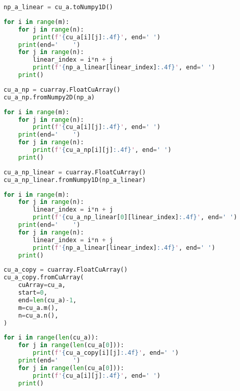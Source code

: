 \documentclass{article}
\begin{document}
    \begin{lstlisting}[language=Python]
np_a_linear = cu_a.toNumpy1D()
    \end{lstlisting}

    \begin{lstlisting}[language=Python]
for i in range(m):
    for j in range(n):
        print(f'{cu_a[i][j]:.4f}', end=' ')
    print(end='    ')
    for j in range(n):
        linear_index = i*n + j
        print(f'{np_a_linear[linear_index]:.4f}', end=' ')
    print()
    \end{lstlisting}

    \begin{lstlisting}[language=Python]
cu_a_np = cuarray.FloatCuArray()
cu_a_np.fromNumpy2D(np_a)
    \end{lstlisting}

    \begin{lstlisting}[language=Python]
for i in range(m):
    for j in range(n):
        print(f'{cu_a[i][j]:.4f}', end=' ')
    print(end='    ')
    for j in range(n):
        print(f'{cu_a_np[i][j]:.4f}', end=' ')
    print()
    \end{lstlisting}

    \begin{lstlisting}[language=Python]
cu_a_np_linear = cuarray.FloatCuArray()
cu_a_np_linear.fromNumpy1D(np_a_linear)
    \end{lstlisting}

    \begin{lstlisting}[language=Python]
for i in range(m):
    for j in range(n):
        linear_index = i*n + j
        print(f'{cu_a_np_linear[0][linear_index]:.4f}', end=' ')
    print(end='    ')
    for j in range(n):
        linear_index = i*n + j
        print(f'{np_a_linear[linear_index]:.4f}', end=' ')
    print()
    \end{lstlisting}

    \begin{lstlisting}[language=Python]
cu_a_copy = cuarray.FloatCuArray()
cu_a_copy.fromCuArray(
    cuArray=cu_a,
    start=0,
    end=len(cu_a)-1,
    m=cu_a.m(),
    n=cu_a.n(),
)
    \end{lstlisting}

    \begin{lstlisting}[language=Python]
for i in range(len(cu_a)):
    for j in range(len(cu_a[0])):
        print(f'{cu_a_copy[i][j]:.4f}', end=' ')
    print(end='    ')
    for j in range(len(cu_a[0])):
        print(f'{cu_a[i][j]:.4f}', end=' ')
    print()
    \end{lstlisting}
\end{document}
